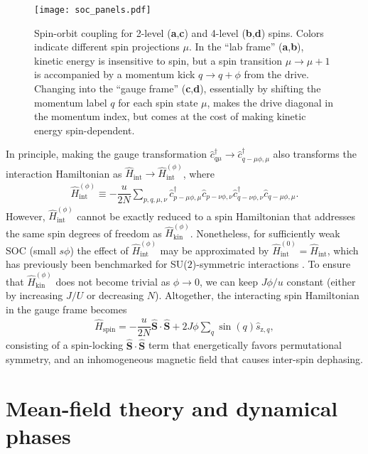\documentclass[aps,pra,nofootinbib,twocolumn,superscriptaddress]{revtex4-2}
\renewcommand{\t}{\text} %
\newcommand{\f}[2]{\dfrac{#1}{#2}} %
\newcommand{\p}[1]{\left(#1\right)} %
\renewcommand{\v}{\bm} %
\newcommand{\1}{\mathds{1}}
\renewcommand{\c}{\hat c}
\newcommand{\s}{\hat s}
\renewcommand{\H}{\hat H}
\renewcommand{\S}{\hat S}
\newcommand{\z}{\text{z}}
\newcommand{\spin}{\text{spin}}
\begin{document}
\begin{figure}
\centering
\texttt{[image: soc\_panels.pdf]}
\caption{
Spin-orbit coupling for 2-level ({\bf a},{\bf c}) and 4-level ({\bf b},{\bf d}) spins.
Colors indicate different spin projections $\mu$.
In the ``lab frame'' ({\bf a},{\bf b}), kinetic energy is insensitive to spin, but a spin transition $\mu\to\mu+1$ is accompanied by a momentum kick $q\to q+\phi$ from the drive.
Changing into the ``gauge frame'' ({\bf c},{\bf d}), essentially by shifting the momentum label $q$ for each spin state $\mu$, makes the drive diagonal in the momentum index, but comes at the cost of making kinetic energy spin-dependent.
}
\label{fig:soc_panels}
\end{figure}

In principle, making the gauge transformation $\c_{q\mu}^\dag\to \c_{q-\mu\phi,\mu}^\dag$ also transforms the interaction Hamiltonian as $\H_{\t{int}} \to \H_{\t{int}}^{(\phi)}$, where
\begin{align}
  \H_{\t{int}}^{(\phi)}
  \equiv -\f{u}{2N} \sum_{p,q,\mu,\nu}
  \c_{p-\mu\phi,\mu}^\dag \c_{p-\nu\phi,\nu}
  \c_{q-\nu\phi,\nu}^\dag \c_{q-\mu\phi,\mu}.
\end{align}
However, $\H_{\t{int}}^{(\phi)}$ cannot be exactly reduced to a spin Hamiltonian that addresses the same spin degrees of freedom as $\H_{\t{kin}}^{(\phi)}$.
Nonetheless, for sufficiently weak SOC (small $s\phi$) the effect of $\H_{\t{int}}^{(\phi)}$ may be approximated by $\H_{\t{int}}^{(0)}=\H_{\t{int}}$, which has previously been benchmarked for SU($2$)-symmetric interactions \cite{he2019engineering, smale2019observation}.
To ensure that $\H_{\t{kin}}^{(\phi)}$ does not become trivial as $\phi\to0$, we can keep $J\phi/u$ constant (either by increasing $J/U$ or decreasing $N$).
Altogether, the interacting spin Hamiltonian in the gauge frame becomes
\begin{align}
  \H_\spin = -\f{u}{2N} \v\S\cdot\v\S + 2J\phi \sum_q \sin\p{q} \s_{\z,q},
  \label{eq:H_spin}
\end{align}
consisting of a spin-locking $\v\S\cdot\v\S$ term that energetically favors permutational symmetry, and an inhomogeneous magnetic field that causes inter-spin dephasing.

\section{Mean-field theory and dynamical phases}
\label{sec:mean_field}
\end{document}
